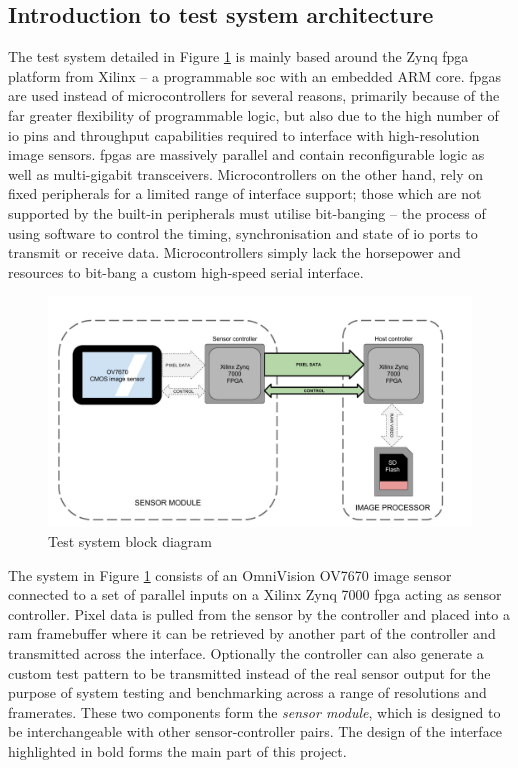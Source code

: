 \subsection{Introduction to test system architecture}

The test system detailed in Figure \ref{fig:block_diagram_overview} is mainly based around the Zynq \gls{fpga} platform from Xilinx -- a programmable \gls{soc} with an embedded ARM core. \Glspl{fpga} are used instead of microcontrollers for several reasons, primarily because of the far greater flexibility of programmable logic, but also due to the high number of \gls{io} pins and throughput capabilities required to interface with high-resolution image sensors. \Glspl{fpga} are massively parallel and contain reconfigurable logic as well as multi-gigabit transceivers. Microcontrollers on the other hand, rely on fixed peripherals for a limited range of interface support; those which are not supported by the built-in peripherals must utilise bit-banging -- the process of using software to control the timing, synchronisation and state of \gls{io} ports to transmit or receive data. Microcontrollers simply lack the horsepower and resources to bit-bang a custom high-speed serial interface.

\begin{figure}
  \centering
  \includegraphics[width=1\textwidth]{./img/block_diagram_overview.png}
  \caption{Test system block diagram}
  \label{fig:block_diagram_overview}
\end{figure}

The system in Figure \ref{fig:block_diagram_overview} consists of an OmniVision OV7670 image sensor connected to a set of parallel inputs on a Xilinx Zynq 7000 \gls{fpga} acting as sensor controller. Pixel data is pulled from the sensor by the controller and placed into a \gls{ram} framebuffer where it can be retrieved by another part of the controller and transmitted across the interface. Optionally the controller can also generate a custom test pattern to be transmitted instead of the real sensor output for the purpose of system testing and benchmarking across a range of resolutions and framerates. These two components form the \textit{sensor module}, which is designed to be interchangeable with other sensor-controller pairs. The design of the interface highlighted in bold forms the main part of this project. 

